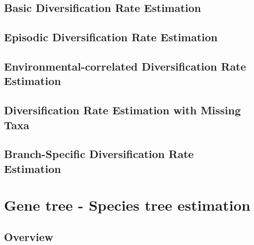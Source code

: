 \documentclass[11pt]{book}
\begin{document}
\chapter{Basic Diversification Rate Estimation}
\def \ResourcePath {RB_DiversificationRate_Tutorial/}


\chapter{Episodic Diversification Rate Estimation}
\def \ResourcePath {RB_DiversificationRate_Episodic_Tutorial/}


\chapter{Environmental-correlated Diversification Rate Estimation}
\def \ResourcePath {RB_DiversificationRate_Environmental_Tutorial/}


\chapter{Diversification Rate Estimation with Missing Taxa}
\def \ResourcePath {RB_DiversificationRate_Sampling_Tutorial/}


\chapter{Branch-Specific Diversification Rate Estimation}
\def \ResourcePath {RB_DiversificationRate_BranchSpecific_Tutorial/}






\part{Gene tree - Species tree estimation}

\chapter{Overview}
\def \ResourcePath {RB_GTST_Tutorial/}

\end{document}
